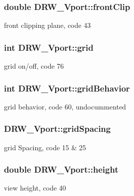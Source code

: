 \subsubsection[{front\+Clip}]{\setlength{\rightskip}{0pt plus 5cm}double D\+R\+W\+\_\+\+Vport\+::front\+Clip}\label{class_d_r_w___vport_a2ee10a71212915501bfdbaa532ec7107}
front clipping plane, code 43 \hypertarget{class_d_r_w___vport_afd06c82134688b83439ab917d399eaa6}{}
\subsubsection[{grid}]{\setlength{\rightskip}{0pt plus 5cm}int D\+R\+W\+\_\+\+Vport\+::grid}\label{class_d_r_w___vport_afd06c82134688b83439ab917d399eaa6}
grid on/off, code 76 \hypertarget{class_d_r_w___vport_a44d1f134682b67fc14a92e468677f493}{}
\subsubsection[{grid\+Behavior}]{\setlength{\rightskip}{0pt plus 5cm}int D\+R\+W\+\_\+\+Vport\+::grid\+Behavior}\label{class_d_r_w___vport_a44d1f134682b67fc14a92e468677f493}
grid behavior, code 60, undocummented \hypertarget{class_d_r_w___vport_a0284747ef8bda7287e99534d9fdc75e5}{}
\subsubsection[{grid\+Spacing}]{ D\+R\+W\+\_\+\+Vport\+::grid\+Spacing}\label{class_d_r_w___vport_a0284747ef8bda7287e99534d9fdc75e5}
grid Spacing, code 15 \& 25 \hypertarget{class_d_r_w___vport_aae2ac1375b707a159d317051a9ff4e9e}{}
\subsubsection[{height}]{\setlength{\rightskip}{0pt plus 5cm}double D\+R\+W\+\_\+\+Vport\+::height}\label{class_d_r_w___vport_aae2ac1375b707a159d317051a9ff4e9e}
view height, code 40 \hypertarget{class_d_r_w___vport_a9d3e2b640f9f9791d50b00f5cae452f9}{}
